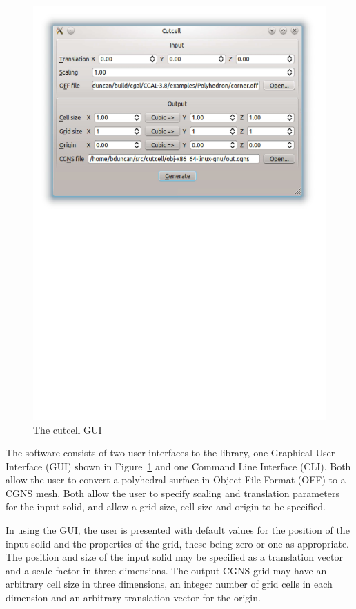 \documentclass[a4paper,10pt]{article}
\begin{document}
\begin{figure}[htb]
 \centering
 \includegraphics[keepaspectratio=true,width=\textwidth]{./cutcellgui.pdf}
 \caption{The cutcell GUI}
 \label{fig:gui}
\end{figure}

The software consists of two user interfaces to the library, one Graphical User
Interface (GUI) shown in Figure~\ref{fig:gui} and one Command Line Interface
(CLI). Both allow the user to convert a polyhedral surface in Object File Format
(OFF) to a CGNS mesh. Both allow the user to specify scaling and translation
parameters for the input solid, and allow a grid size, cell size and origin to
be specified.

In using the GUI, the user is presented with default values for the position of
the input solid and the properties of the grid, these being zero or one as
appropriate. The position and size of the input solid may be specified as a
translation vector and a scale factor in three dimensions. The output CGNS grid
may have an arbitrary cell size in three dimensions, an integer number of grid
cells in each dimension and an arbitrary translation vector for the origin.
\end{document}
